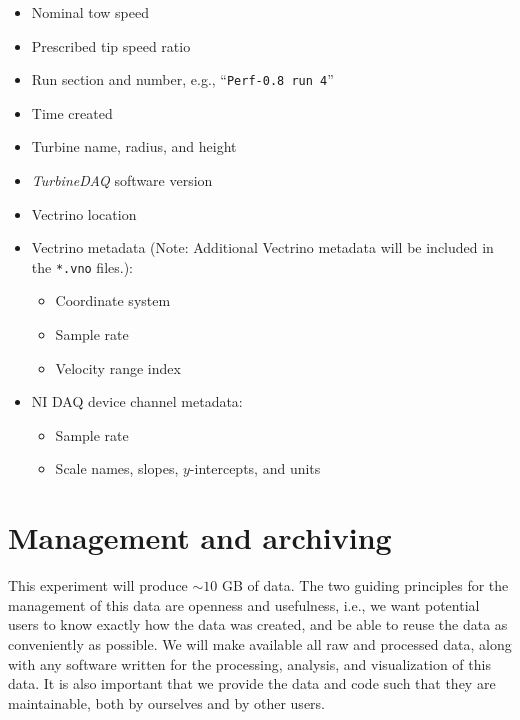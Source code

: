 \documentclass[12pt,letterpaper]{scrreprt}
\begin{document}
\begin{itemize}

	\item Nominal tow speed
	
	\item Prescribed tip speed ratio
	
	\item Run section and number, e.g., ``\texttt{Perf-0.8 run 4}''
	
	\item Time created
	
	\item Turbine name, radius, and height
	
	\item \textit{TurbineDAQ} software version
	
	\item Vectrino location
	
	\item Vectrino metadata (Note: Additional Vectrino metadata will be included in
	the \texttt{*.vno} files.):
	
		\begin{itemize}
		
			\item Coordinate system
			
			\item Sample rate
			
			\item Velocity range index
		
		\end{itemize}
		
	\item NI DAQ device channel metadata:
	
		\begin{itemize}
		
		\item Sample rate
		
		\item Scale names, slopes, $y$-intercepts, and units 
		
		\end{itemize}

\end{itemize}


\section{Management and archiving}

This experiment will produce $\sim 10$ GB of data. The two guiding principles
for the management of this data are openness and usefulness, i.e., we want
potential users to know exactly how the data was created, and be able to reuse
the data as conveniently as possible. We will make available all raw and
processed data, along with any software written for the processing, analysis,
and visualization of this data. It is also important that we provide the data
and code such that they are maintainable, both by ourselves and by other users.
\end{document}
